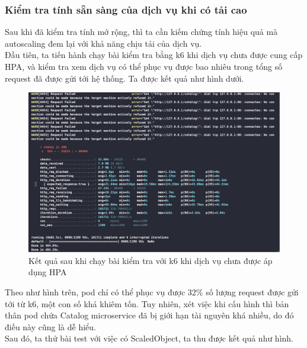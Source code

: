 \subsubsection{Kiểm tra tính sẵn sàng của dịch vụ khi có tải cao}
\noindent Sau khi đã kiểm tra tính mở rộng, thì ta cần kiếm chứng tính hiệu quả mà autoscaling đem lại với khả năng chịu tải của dịch vụ.\\[0.5cm]
Đầu tiên, ta tiến hành chạy bài kiểm tra bằng k6 khi dịch vụ chưa được cung cấp HPA, và kiểm tra xem dịch vụ có thể phục vụ được bao nhiêu trong tổng số request đã được gửi tới hệ thống. Ta được kết quả như hình dưới.
\begin{figure}[H]
  \begin{center}
    \includegraphics[scale=0.44]{images/hanh/test-without-hpa.png}
    \caption{Kết quả sau khi chạy bài kiểm tra với k6 khi dịch vụ chưa được áp dụng HPA}
  \end{center}
  \label{}
\end{figure}
Theo như hình trên, pod chỉ có thể phục vụ được 32\% số lượng request được gửi tới từ k6, một con số khá khiêm tốn. Tuy nhiên, xét việc khi cấu hình thì bản thân pod chứa Catalog microservice đã bị giới hạn tài nguyên khá nhiều, do đó điều này cũng là dễ hiểu.\\[0.5cm]
Sau đó, ta thử bài test với việc có ScaledObject, ta thu được kết quả như hình.
